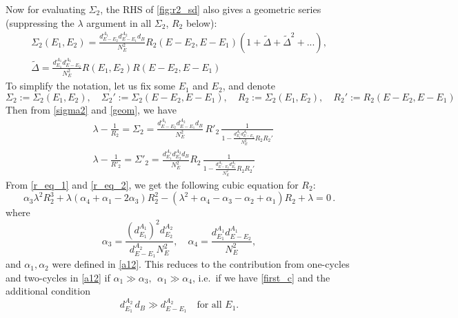 \documentclass[a4paper,11pt]{article}
\newcommand{\be}{\begin{equation}}
\newcommand{\ee}{\end{equation}}
\begin{document}
\begin{enumerate}
\begin{appendix}
Now for evaluating $\Sigma_2$, the RHS of \eqref{fig:r2_sd} also gives a geometric series (suppressing the $\lambda$ argument in all $\Sigma_2$, $R_2$ below): 
\be \begin{gathered} 
\Sigma_2(E_1, E_2) = \frac{d^{A_1}_{E-E_2}d^{A_2}_{E-E_1} d_B}{N_E^2} R_2(E-E_2, E-E_1) (1+ \tilde{\Delta} + \tilde{\Delta}^2 + ...), \\
\tilde{\Delta} = \frac{d^{A_1}_{E_1}d^{A_1}_{E-E_2}}{N_E^2} R(E_1, E_2) R(E-E_2, E-E_1)
\end{gathered} 
\label{sigma2}
\ee
To simplify the notation, let us fix some $E_1$ and $E_2$, and denote 
\be 
\Sigma_2 := \Sigma_2(E_1, E_2), \quad \Sigma_2' := \Sigma_2(E-E_2, E-E_1), \quad R_2 := \Sigma_2(E_1, E_2), \quad R_2' := R_2(E-E_2, E-E_1)
\ee
Then from \eqref{sigma2} and \eqref{geom}, we have 
\begin{align} 
&\lambda - \frac{1}{R_2}= \Sigma_2 = \frac{d^{A_1}_{E-E_2} d^{A_2}_{E-E_1} d_B}{N_E^2}\, R'_2 \, \frac{1}{1-\frac{d^{A_1}_{E_1} d^{A_1}_{E-E_2}}{N_E^2} R_2 R_2'}\label{r_eq_1} \\
&\lambda - \frac{1}{R'_2}= \Sigma'_2 = \frac{d^{A_1}_{E_1} d^{A_2}_{E_2} d_B}{N_E^2} R_2 \, \frac{1}{1-\frac{d^{A_1}_{E-E_2} d^{A_1}_{E_1}}{N_E^2} R_2 R_2'} \label{r_eq_2}
\end{align} 
From \eqref{r_eq_1} and \eqref{r_eq_2}, we get the following cubic equation for $R_2$: 
\be 
\alpha_3 \lambda^2 R_2^3 + \lambda (\alpha_4+\alpha_1-2\alpha_3) R_2^2 -(\lambda^2 + \alpha_4- \alpha_3 -\alpha_2+\alpha_1) R_2 + \lambda = 0 \,. 
\ee
where 
\be 
\alpha_3= \frac{(d^{A_1}_{E_1})^2 d^{A_2}_{E_2}}{d^{A_2}_{E-E_1} N_E^2}, \quad \alpha_4= \frac{d^{A_1}_{E_1} d^{A_1}_{E-E_2}}{N_E^2}, 
\ee
and $\alpha_1, \alpha_2$ were defined in \eqref{a12}. This reduces to the contribution from one-cycles and two-cycles in \eqref{a12} if $\alpha_1\gg \alpha_3, ~~\alpha_1 \gg \alpha_4$, i.e.~if we have \eqref{first_c} and the additional condition 
\be 
d^{A_2}_{E_1} \, d_B \gg d^{A_2}_{E-E_1} \quad {\text{for all } E_1. }
\ee


\end{appendix}
\end{enumerate}
\end{document}

